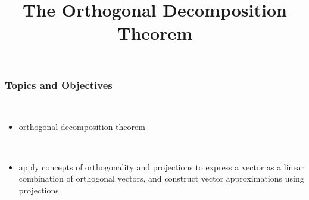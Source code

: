 \title{The Orthogonal Decomposition Theorem}
\subtitle{\SubTitleName}
\institute[]{\Course}
\author{\Instructor}
\maketitle   
  



\begin{frame}\frametitle{Topics and Objectives}
 \\
\begin{itemize}
    \item orthogonal decomposition theorem
\end{itemize}

\vspace{0.5cm}

\\


\begin{itemize}
    \item apply concepts of orthogonality and projections to express a vector as a linear combination of orthogonal vectors,
        and construct vector approximations using projections
    \end{itemize}

    \vspace{0.25cm} 
\end{frame}

